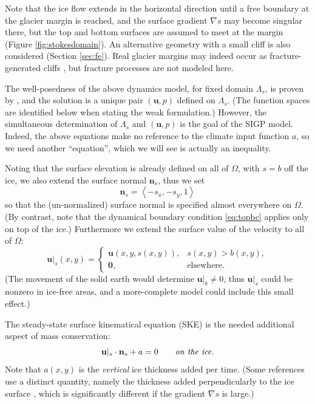 \documentclass[letterpaper,final,12pt,reqno]{amsart}
\theoremstyle{claim}
\newcommand{\grad}{\nabla}
\newcommand{\bn}{\mathbf{n}}
\newcommand{\bu}{\mathbf{u}}
\newcommand{\bzero}{\bm{0}}
\numberwithin{equation}{section}
\numberwithin{figure}{section}
\numberwithin{table}{section}
\numberwithin{theorem}{section}
\begin{document}
Note that the ice flow extends in the horizontal direction until a free boundary at the glacier margin is reached, and the surface gradient $\grad s$ may become singular there, but the top and bottom surfaces are assumed to meet at the margin (Figure \ref{fig:stokesdomain}).  An alternative geometry with a small cliff is also considered (Section \ref{sec:fe}).  Real glacier margins may indeed occur as fracture-generated cliffs \cite{PralongFunk2005}, but fracture processes are not modeled here.

The well-posedness of the above dynamics model, for fixed domain $\Lambda_s$, is proven by \cite{JouvetRappaz2011}, and the solution is a unique pair $(\bu,p)$ defined on $\Lambda_s$.  (The function spaces are identified below when stating the weak formulation.)  However, the simultaneous determination of $\Lambda_s$ and $(\bu,p)$ is the goal of the SIGP model.  Indeed, the above equations make no reference to the climate input function $a$, so we need another ``equation'', which we will see is actually an inequality.

\newcommand{\bus}{\bu|_s}

Noting that the surface elevation is already defined on all of $\Omega$, with $s=b$ off the ice, we also extend the surface normal $\bn_s$, thus we set
\begin{equation}
\bn_s = \left<-s_x,-s_y,1\right> \label{eq:surfacenormal}
\end{equation}
so that the (un-normalized) surface normal is specified almost everywhere on $\Omega$.  (By contrast, note that the dynamical boundary condition \eqref{eq:topbc} applies only on top of the ice.)  Furthermore we extend the surface value of the velocity to all of $\Omega$:
\begin{equation}
\bus(x,y) = \begin{cases} \bu(x,y,s(x,y)), & s(x,y) > b(x,y), \\
                     \bzero, & \text{elsewhere}. \end{cases} \label{eq:surfacevelocity}
\end{equation}
(The movement of the solid earth would determine $\bu|_b \ne 0$, thus $\bu|_s$ could be nonzero in ice-free areas, and a more-complete model could include this small effect.)

The steady-state surface kinematical equation (SKE) \cite[see equation (5.21)]{GreveBlatter2009} is the needed additional aspect of mass conservation:
\begin{equation}
\bus \cdot \bn_s + a = 0 \qquad \text{\emph{on the ice}}. \label{eq:ske}
\end{equation}
Note that $a(x,y)$ is the \emph{vertical} ice thickness added per time.  (Some references use a distinct quantity, namely the thickness added perpendicularly to the ice surface \cite{GreveBlatter2009}, which is significantly different if the gradient $\grad s$ is large.)
\end{document}
